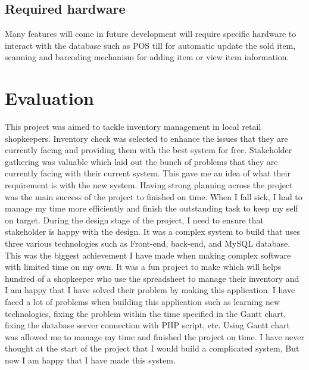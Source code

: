 \subsection{Required hardware}
Many features will come in future development will require specific hardware to interact with the database such as POS till for automatic update the sold item, scanning and barcoding mechanism for adding item or view item information. 

\section{Evaluation}
This project was aimed to tackle inventory management in local retail shopkeepers. Inventory check was selected to enhance the issues that they are currently facing and providing them with the best system for free. Stakeholder gathering was valuable which laid out the bunch of problems that they are currently facing with their current system. This gave me an idea of what their requirement is with the new system. Having strong planning across the project was the main success of the project to finished on time. When I fall sick, I had to manage my time more efficiently and finish the outstanding task to keep my self on target. During the design stage of the project, I need to ensure that stakeholder is happy with the design.\newline
\newline It was a complex system to build that uses three various technologies such as Front-end, back-end, and MySQL database. This was the biggest achievement I have made when making complex software with limited time on my own. It was a fun project to make which will helps hundred of a shopkeeper who use the spreadsheet to manage their inventory and I am happy that I have solved their problem by making this application. I have faced a lot of problems when building this application such as learning new technologies, fixing the problem within the time specified in the Gantt chart, fixing the database server connection with PHP script, etc. Using Gantt chart was allowed me to manage my time and finished the project on time.\newline
\newline I have never thought at the start of the project that I would build a complicated system, But now I am happy that I have made this system.  